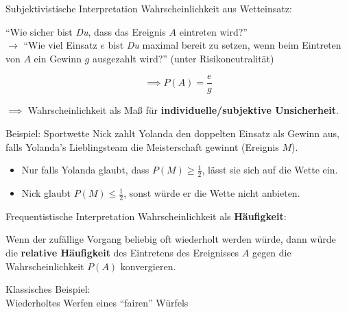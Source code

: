 \documentclass[
  10pt,
  ignorenonframetext,
]{beamer}
\providecommand{\tightlist}{%
  \setlength{\itemsep}{0pt}\setlength{\parskip}{0pt}}
\begin{document}
\begin{frame}{Subjektivistische Interpretation}
\label{subjektivistische-interpretation}
Wahrscheinlichkeit aus Wetteinsatz:

``Wie sicher bist \emph{Du}, dass das Ereignis \(A\) eintreten wird?''\\
\(\longrightarrow\) ``Wie viel Einsatz \(e\) bist \emph{Du} maximal
bereit zu setzen, wenn beim Eintreten von \(A\) ein Gewinn \(g\)
ausgezahlt wird?'' (unter Risikoneutralität)

\[\implies P(A) = \frac{e}{g}\]

\(\implies\) Wahrscheinlichkeit als Maß für
\textbf{individuelle/subjektive Unsicherheit}.

\end{frame}

\begin{frame}{Beispiel: Sportwette}
\label{beispiel-sportwette}
Nick zahlt Yolanda den doppelten Einsatz als Gewinn aus, falls Yolanda's
Lieblingsteam die Meisterschaft gewinnt (Ereignis \(M\)).

\begin{itemize}
\tightlist
\item
  Nur falls Yolanda glaubt, dass \(P(M) \geq \frac12\), lässt sie sich
  auf die Wette ein.
\item
  Nick glaubt \(P(M) \leq \frac12\), sonst würde er die Wette nicht
  anbieten.
\end{itemize}
\end{frame}

\begin{frame}{Frequentistische Interpretation}
\label{frequentistische-interpretation}
Wahrscheinlichkeit als \textbf{Häufigkeit}:

Wenn der zufällige Vorgang beliebig oft wiederholt werden würde, dann
würde die \textbf{relative Häufigkeit} des Eintretens des Ereignisses
\(A\) gegen die Wahrscheinlichkeit \(P(A)\) konvergieren.

Klassisches Beispiel:\\
Wiederholtes Werfen eines ``fairen'' Würfels
\end{frame}
\end{document}
